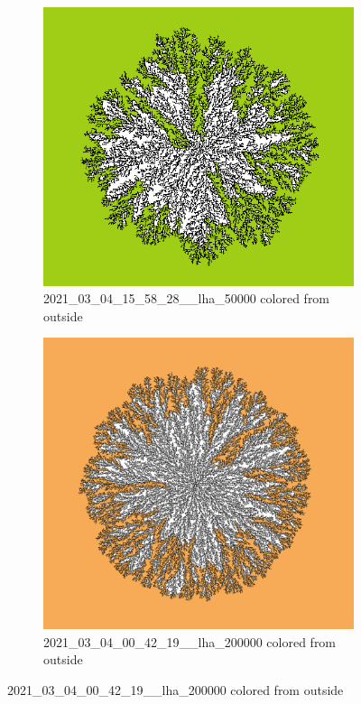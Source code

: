 \documentclass[12pt,a4paper]{scrartcl}
\newcommand{\1}{\mathbbm{1}}
\theoremstyle{definition}
\numberwithin{equation}{section}
\begin{document}
\begin{figure}[p]
	\centering
	\begin{subfigure}[]{0.77\textwidth}
		\centerline{\includegraphics[width=1\linewidth]{images/ia/2021_03_04_15_58_28__lha_50000_colored.png}}
		\captionsetup{labelformat=empty}
		\caption{2021\_03\_04\_15\_58\_28\_\_lha\_50000 colored from outside} 
	\end{subfigure}
	\begin{subfigure}[]{0.77\textwidth}
		\centerline{\includegraphics[width=1\linewidth]{images/ia/2021_03_04_00_42_19__lha_200000_colored.png}}
		\captionsetup{labelformat=empty}
		\caption{2021\_03\_04\_00\_42\_19\_\_lha\_200000 colored from outside} 
	\end{subfigure}
\end{figure}
\end{document}

